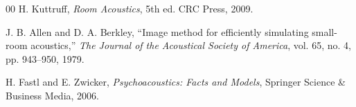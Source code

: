 \documentclass[conference]{IEEEtran}
\begin{document}
\begin{thebibliography}{00}
 H. Kuttruff, \textit{Room Acoustics}, 5th ed. CRC Press, 2009.

 J. B. Allen and D. A. Berkley, ``Image method for efficiently simulating small-room acoustics,'' \textit{The Journal of the Acoustical Society of America}, vol. 65, no. 4, pp. 943--950, 1979.

 H. Fastl and E. Zwicker, \textit{Psychoacoustics: Facts and Models}, Springer Science \& Business Media, 2006.

\end{thebibliography}
\end{document}
